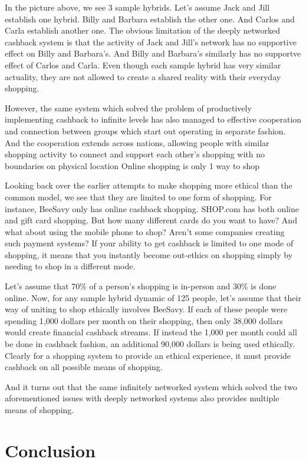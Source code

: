 \documentclass{article}%
\begin{document}
In the picture above, we see 3 sample hybrids. Let's assume Jack and Jill establish one hybrid. Billy and Barbara establish the other one. And Carlos and Carla establish another one. The obvious limitation of the deeply networked cashback system is that the activity of Jack and Jill's network has no supportive effect on Billy and Barbara's. And Billy and Barbara's similarly has no supportve effect of Carlos and Carla. Even though each sample hybrid has very similar actuality, they are not allowed to create a shared reality with their everyday shopping.

However, the same system which solved the problem of productively implementing cashback to infinite levels has also managed to effective cooperation and connection between groups which start out operating in separate fashion. And the cooperation extends across nations, allowing people with similar shopping activity to connect and support each other's shopping with no boundaries on physical location
Online shopping is only 1 way to shop

Looking back over the earlier attempts to make shopping more ethical than the common model, we see that they are limited to one form of shopping. For instance, BeeSavy only has online cashback shopping. SHOP.com has both online and gift card shopping. But how many different cards do you want to have? And what about using the mobile phone to shop? Aren't some companies creating such payment systems? If your ability to get cashback is limited to one mode of shopping, it means that you instantly become out-ethics on shopping simply by needing to shop in a different mode. 

Let's assume that 70\% of a person's shopping is in-person and 30\% is done online. Now, for any sample hybrid dynamic of 125 people, let's assume that their way of uniting to shop ethically involves BeeSavy. If each of these people were spending 1,000 dollars per month on their shopping, then only 38,000 dollars would create financial cashback streams. If instead the 1,000 per month could all be done in cashback fashion, an additional 90,000 dollars is being used ethically. Clearly for a shopping system to provide an ethical experience, it must provide cashback on all possible means of shopping.

And it turns out that the same infinitely networked system which solved the two aforementioned issues with deeply networked systems also provides multiple means of shopping.

\section{Conclusion}
\end{document}
